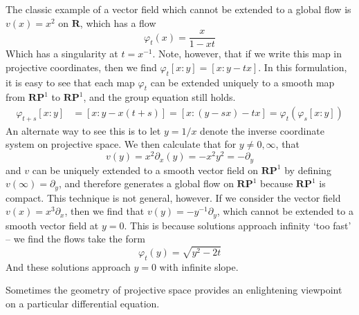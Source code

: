 \begin{example}
    The classic example of a vector field which cannot be extended to a global flow is $v(x) = x^2$ on $\mathbf{R}$, which has a flow
    \[ \varphi_t(x) = \frac{x}{1 - xt} \]
    Which has a singularity at $t = x^{-1}$. Note, however, that if we write this map in projective coordinates, then we find $\varphi_t[x:y] = [x:y - tx]$. In this formulation, it is easy to see that each map $\varphi_t$ can be extended uniquely to a smooth map from $\mathbf{RP}^1$ to $\mathbf{RP}^1$, and the group equation still holds.
    \begin{align*}
        \varphi_{t+s}[x:y] &= [x:y - x(t+s)] = [x:(y - sx) - tx] = \varphi_t(\varphi_s[x:y])
    \end{align*}
    An alternate way to see this is to let $y = 1/x$ denote the inverse coordinate system on projective space. We then calculate that for $y \neq 0, \infty$, that
    \[ v(y) = x^2 \partial_x(y) = - x^2 y^2 = - \partial_y \]
    and $v$ can be uniquely extended to a smooth vector field on $\mathbf{RP}^1$ by defining $v(\infty) = \partial_y$, and therefore generates a global flow on $\mathbf{RP}^1$ because $\mathbf{RP}^1$ is compact. This technique is not general, however. If we consider the vector field $v(x) = x^3 \partial_x$, then we find that $v(y) = -y^{-1} \partial_y$, which cannot be extended to a smooth vector field at $y = 0$. This is because solutions approach infinity `too fast' -- we find the flows take the form
    \[ \varphi_t(y) = \sqrt{y^2 - 2t} \]
    And these solutions approach $y = 0$ with infinite slope.
\end{example}

Sometimes the geometry of projective space provides an enlightening viewpoint on a particular differential equation.

